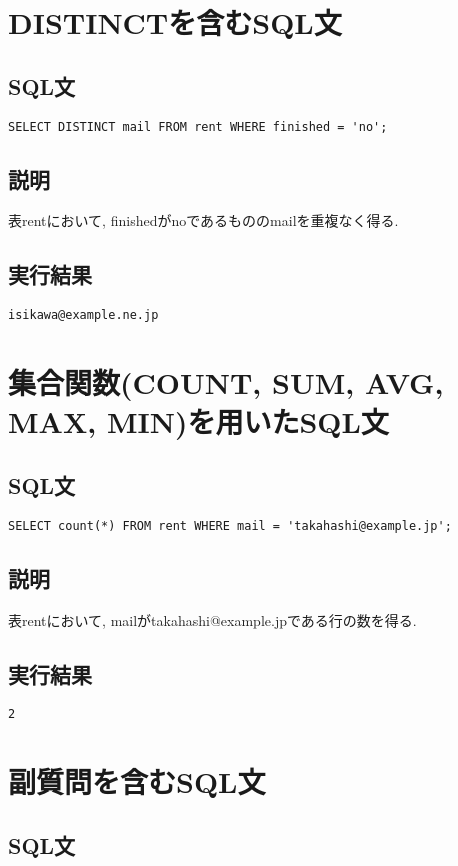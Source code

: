 \documentclass{jarticle}
\begin{document}
\section{DISTINCTを含むSQL文}
\subsection{SQL文}
\begin{verbatim}
SELECT DISTINCT mail FROM rent WHERE finished = 'no';
\end{verbatim}
\subsection{説明}
表rentにおいて, finishedがnoであるもののmailを重複なく得る.
\subsection{実行結果}
\begin{verbatim}
isikawa@example.ne.jp
\end{verbatim}
\section{集合関数(COUNT, SUM, AVG, MAX, MIN)を用いたSQL文}
\subsection{SQL文}
\begin{verbatim}
SELECT count(*) FROM rent WHERE mail = 'takahashi@example.jp';
\end{verbatim}
\subsection{説明}
表rentにおいて, mailがtakahashi@example.jpである行の数を得る.
\subsection{実行結果}
\begin{verbatim}
2
\end{verbatim}
\section{副質問を含むSQL文}
\subsection{SQL文}
\begin{verbatim}
\end{verbatim}
\end{document}
